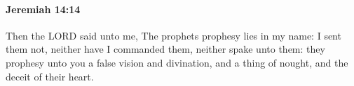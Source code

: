 
		\paragraph{Jeremiah 14:14} %
			\label{JEREMIAH-14-14}

			Then the LORD said unto me, The prophets prophesy lies in my name: I sent them not, neither have I commanded them, neither spake unto them: they prophesy unto you a false vision and divination, and a thing of nought, and the deceit of their heart.


